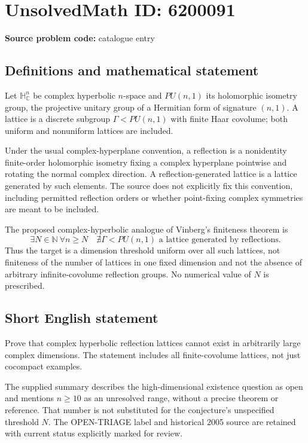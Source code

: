 \documentclass[11pt]{article}
\newcommand{\N}{\mathbb{N}}
\newcommand{\C}{\mathbb{C}}
\begin{document}
\section*{UnsolvedMath ID: 6200091}
\textbf{Source problem code:} catalogue entry
\subsection{Definitions and mathematical statement}
Let $\mathbb H^n_{\C}$ be complex hyperbolic $n$-space and $PU(n,1)$ its holomorphic isometry group, the projective unitary group of a Hermitian form of signature $(n,1)$. A lattice is a discrete subgroup $\Gamma<PU(n,1)$ with finite Haar covolume; both uniform and nonuniform lattices are included.

Under the usual complex-hyperplane convention, a reflection is a nonidentity finite-order holomorphic isometry fixing a complex hyperplane pointwise and rotating the normal complex direction. A reflection-generated lattice is a lattice generated by such elements. The source does not explicitly fix this convention, including permitted reflection orders or whether point-fixing complex symmetries are meant to be included.

The proposed complex-hyperbolic analogue of Vinberg's finiteness theorem is
\[
 \exists N\in\N\ \forall n\ge N\quad
 \nexists\Gamma<PU(n,1)\text{ a lattice generated by reflections}.
\]
Thus the target is a dimension threshold uniform over all such lattices, not finiteness of the number of lattices in one fixed dimension and not the absence of arbitrary infinite-covolume reflection groups. No numerical value of $N$ is prescribed.
\subsection{Short English statement}
Prove that complex hyperbolic reflection lattices cannot exist in arbitrarily large complex dimensions. The statement includes all finite-covolume lattices, not just cocompact examples.

The supplied summary describes the high-dimensional existence question as open and mentions $n\ge10$ as an unresolved range, without a precise theorem or reference. That number is not substituted for the conjecture's unspecified threshold $N$. The OPEN-TRIAGE label and historical 2005 source are retained with current status explicitly marked for review.
\end{document}
